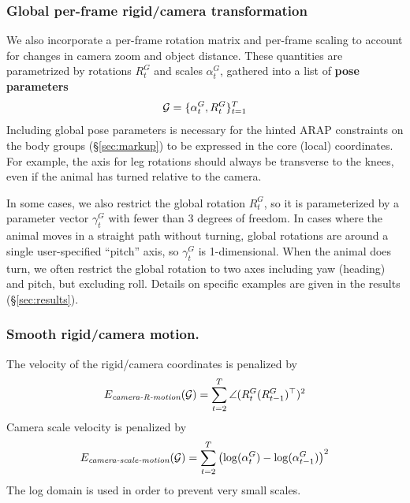 \documentclass[preprint]{acmsiggraph}
\begin{document}

\subsubsection{Global per-frame rigid/camera transformation}
We also incorporate a per-frame rotation matrix and per-frame scaling to account for changes in camera zoom and object distance.  These quantities are parametrized by rotations $R^G_t$ and scales $\alpha^G_t$, gathered into a list of {\bf pose parameters}
\begin{equation}
\mathcal{G} = \{\alpha^G_t, R^G_t\}_{t=1}^T
\end{equation}
Including global pose parameters is necessary for the hinted ARAP constraints on the body groups (\S\ref{sec:markup}) to be expressed in the core (local) coordinates. For example, the axis for leg rotations should always be transverse to the knees, even if the animal has turned relative to the camera.

In some cases, we also restrict the global rotation $R^G_t$, so it is parameterized by a parameter vector $\gamma^G_t$ with fewer than 3 degrees of freedom.  In cases where the animal moves in a straight path without turning, global rotations are around a single user-specified ``pitch'' axis, so $\gamma^G_t$ is 1-dimensional.  When the animal does turn, we often restrict the global rotation to two axes including yaw (heading) and pitch, but excluding roll.  Details on specific examples are given in the results (\S\ref{sec:results}).

\subsubsection{Smooth rigid/camera motion.} 
The velocity of the rigid/camera coordinates is penalized by
\begin{equation}
E_{\text{\em camera-R-motion}}(\mathcal{G}) = \sum_{t=2}^T \angle(R^G_t (R^G_{t-1})^\top)^2
\end{equation}
Camera scale velocity is penalized by
\begin{equation}
E_{\text{\em camera-scale-motion}}(\mathcal{G}) = \sum_{t=2}^T \left ( \log(\alpha^G_{t}) - \log(\alpha^G_{t-1}) \right )^2
\end{equation}
The log domain is used in order to prevent very small scales. 
\end{document}
